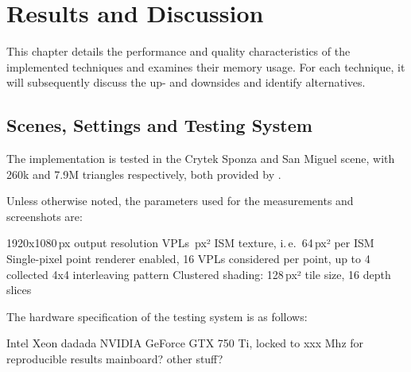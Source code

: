 

\chapter{Results and Discussion}
\label{chap:results}

This chapter details the performance and quality characteristics of the implemented techniques and  examines their memory usage. For each technique, it will subsequently discuss the up- and downsides and identify alternatives.

\section{Scenes, Settings and Testing System}

The implementation is tested in the Crytek Sponza and San Miguel scene, with 260k and 7.9M triangles respectively, both provided by \citet{McGuire2011Data}.


Unless otherwise noted, the parameters used for the measurements and screenshots are:
\begin{outline}
    \1 1920x1080\,px output resolution
     VPLs
    \,px² ISM texture, i.\,e.\ 64\,px² per ISM
    \1 Single-pixel point renderer enabled, 16 VPLs considered per point, up to 4 collected
    \1 4x4 interleaving pattern
    \1 Clustered shading: 128\,px² tile size, 16 depth slices
\end{outline}

\noindent
The hardware specification of the testing system is as follows:
\begin{outline}
    \1 Intel Xeon dadada
    \1 NVIDIA GeForce GTX 750 Ti, locked to xxx Mhz for reproducible results
    \1 mainboard?
    \1 other stuff?
\end{outline}


